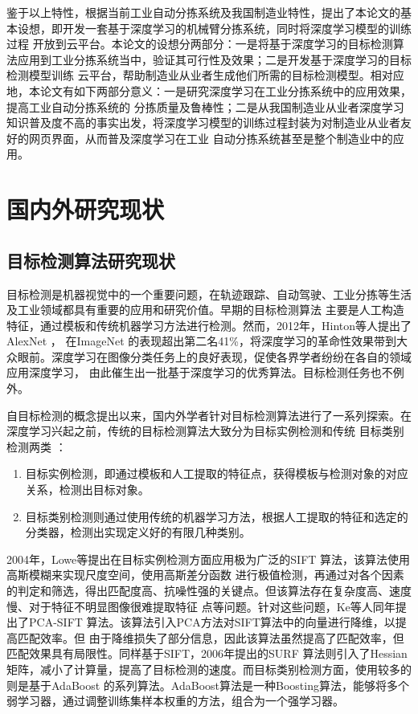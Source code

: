 鉴于以上特性，根据当前工业自动分拣系统及我国制造业特性，提出了本论文的基本设想，即开发一套基于深度学习的机械臂分拣系统，同时将深度学习模型的训练过程
开放到云平台。本论文的设想分两部分：一是将基于深度学习的目标检测算法应用到工业分拣系统当中，验证其可行性及效果；二是开发基于深度学习的目标检测模型训练
云平台，帮助制造业从业者生成他们所需的目标检测模型。相对应地，本论文有如下两部分意义：一是研究深度学习在工业分拣系统中的应用效果，提高工业自动分拣系统的
分拣质量及鲁棒性；二是从我国制造业从业者深度学习知识普及度不高的事实出发，将深度学习模型的训练过程封装为对制造业从业者友好的网页界面，从而普及深度学习在工业
自动分拣系统甚至是整个制造业中的应用。


\section{国内外研究现状}
\subsection{目标检测算法研究现状}
目标检测是机器视觉中的一个重要问题，在轨迹跟踪、自动驾驶、工业分拣等生活及工业领域都具有重要的应用和研究价值。早期的目标检测算法
主要是人工构造特征，通过模板和传统机器学习方法进行检测。然而，2012年，Hinton等人提出了AlexNet   \cite{NIPS2012_4824}，
在ImageNet
的表现超出第二名41\%，将深度学习的革命性效果带到大众眼前。深度学习在图像分类任务上的良好表现，促使各界学者纷纷在各自的领域应用深度学习，
由此催生出一批基于深度学习的优秀算法。目标检测任务也不例外。

自目标检测的概念提出以来，国内外学者针对目标检测算法进行了一系列探索。在深度学习兴起之前，传统的目标检测算法大致分为目标实例检测和传统
目标类别检测两类    \cite{MBJC:2018}：
\begin{enumerate}
    \item{目标实例检测，即通过模板和人工提取的特征点，获得模板与检测对象的对应关系，检测出目标对象。}
    \item{目标类别检测则通过使用传统的机器学习方法，根据人工提取的特征和选定的分类器，检测出实现定义好的有限几种类别。}
\end{enumerate}

2004年，Lowe等提出在目标实例检测方面应用极为广泛的SIFT  \cite{Lowe2004}
算法，该算法使用高斯模糊来实现尺度空间，使用高斯差分函数
进行极值检测，再通过对各个因素的判定和筛选，得出匹配度高、抗噪性强的关键点。但该算法存在复杂度高、速度慢、对于特征不明显图像很难提取特征
点等问题。针对这些问题，Ke等人同年提出了PCA-SIFT    \cite{PCA-SIFT:2004}
算法。该算法引入PCA方法对SIFT算法中的向量进行降维，以提高匹配效率。但
由于降维损失了部分信息，因此该算法虽然提高了匹配效率，但匹配效果具有局限性。同样基于SIFT，2006年提出的SURF  \cite{SURF2006}
算法则引入了Hessian
矩阵，减小了计算量，提高了目标检测的速度。而目标类别检测方面，使用较多的则是基于AdaBoost    \cite{AdaBoost1996}
的系列算法。AdaBoost算法是一种Boosting算法，能够将多个弱学习器，通过调整训练集样本权重的方法，组合为一个强学习器。

